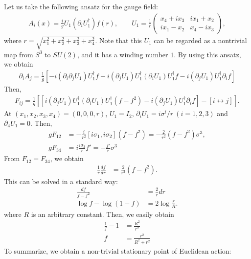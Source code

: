 \documentclass[11pt,a4paper]{article}
\begin{document}
Let us take the following ansatz for the gauge field:
\begin{align}
A_i(x) =  \frac{i}{g} U_1 (\partial_i U_1^\dagger) f(r), \qquad
U_1 = \frac{1}{r} \left(\begin{array}{cc}
x_4 + i x_3 & i x_1 + x_2 \\
i x_1 - x_2 & x_4 - i x_3
\end{array}\right),
\end{align}
where $r = \sqrt{x_1^2 + x_2^2 + x_3^2 + x_4^2}$.
Note that this $U_1$ can be regarded as a nontrivial map from $S^3$ to $SU(2)$, and it has a winding number $1$.
By using this ansatz, we obtain
\begin{align}
\partial_i A_j =
\frac{1}{g}\left[ - i (\partial_i \partial_j U_1) U_1^\dagger f
+ i (\partial_j U_1) U_1^\dagger (\partial_i U_1) U_1^\dagger f
- i (\partial_j U_1) U_1^\dagger \partial_i f \right]
\end{align}
%
Then,
\begin{align}
F_{ij} = \frac{1}{g} \left[
\left[ i (\partial_j U_1) U_1^\dagger (\partial_i U_1) U_1^\dagger (f - f^2)
- i (\partial_j U_1) U_1^\dagger \partial_i f \right] - \left[ i \leftrightarrow j \right] \right].
\end{align}
%
At $(x_1,x_2,x_3,x_4)=(0,0,0,r)$, $U_1 = I_2$, $\partial_i U_1 = i \sigma^i/r~(i=1,2,3)$ and $\partial_4 U_1 = 0$. Then,
\begin{align}
g F_{12} &= -\frac{i}{r^2} [i\sigma_1, i\sigma_2] (f-f^2) = -\frac{2}{r^2}(f-f^2) \sigma^3, \\
g F_{34} &= i \frac{i\sigma_3}{r} f' = -\frac{f'}{r} \sigma^3
\end{align}
%
From $F_{12} = F_{34}$, we obtain
\begin{align}
\frac{1}{r} \frac{df}{dr} &= \frac{2}{r^2}(f-f^2).
\end{align}
%
This can be solved in a standard way:
\begin{align}
\frac{df}{f-f^2} &= \frac{2}{r}dr \nonumber\\
\log f - \log (1-f) &= 2 \log \frac{r}{R}.
\end{align}
where $R$ is an arbitrary constant. Then, we easily obtain
\begin{align}
\frac{1}{f}-1 &= \frac{R^2}{r^2} \nonumber\\
f &= \frac{r^2}{R^2 + r^2}
\end{align}
%
To summarize, we obtain a non-trivial stationary point of Euclidean action:
\end{document}
